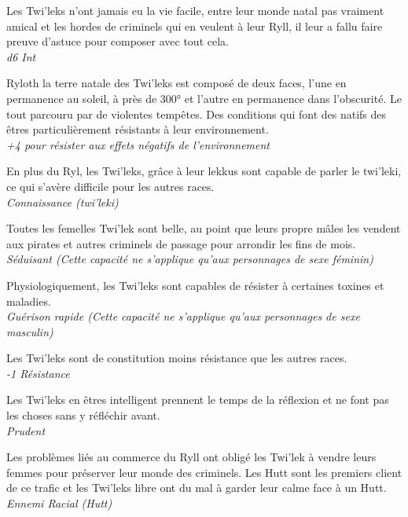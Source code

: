 \begin{description}[align=left]
\item [Rusé \& Astucieux] 			%
		Les Twi’leks n’ont jamais eu la vie facile, entre leur monde natal pas vraiment amical et les hordes de criminels qui en veulent à leur Ryll, il leur a fallu faire preuve d’astuce pour composer avec tout cela.\\
		\emph{d6 Int}

\item [Ni chaud ni froid] 			%
		Ryloth la terre natale des Twi’leks est composé de deux faces, l’une en permanence au soleil, à près de 300° et l’autre en permanence dans l’obscurité. Le tout parcouru par de violentes tempêtes. Des conditions qui font des natifs des êtres particulièrement résistants à leur environnement.\\
		\emph{+4 pour résister aux effets négatifs de l’environnement}

\item [Lekkus Speaking] 			%
		En plus du Ryl, les Twi’leks, grâce à leur lekkus sont capable de parler le twi’leki, ce qui s’avère difficile pour les autres races.\\
		\emph{Connaissance (twi’leki)}

\item [Belle plante (Femelles)] 	%
		Toutes les femelles Twi’lek sont belle, au point que leurs propre mâles les vendent aux pirates et autres criminels de passage pour arrondir les fins de mois.\\
		\emph{Séduisant (Cette capacité ne s’applique qu’aux personnages de sexe féminin)}

\item [Immunisé (Mâles)] 			%
		Physiologiquement, les Twi’leks sont capables de résister à certaines toxines et maladies.\\
		\emph{Guérison rapide (Cette capacité ne s’applique qu’aux personnages de sexe masculin)}

\item [Frêles] 						%
		Les Twi’leks sont de constitution moins résistance que les autres races.\\
		\emph{-1 Résistance}

\item [Prudent] 					%
		Les Twi’leks en êtres intelligent prennent le temps de la réflexion et ne font pas les choses sans y réfléchir avant.\\
		\emph{Prudent}

\item [Hutt(er)] 					%
		Les problèmes liés au commerce du Ryll ont obligé les Twi’lek à vendre leurs femmes pour préserver leur monde des criminels. Les Hutt sont les premiers client de ce trafic et les Twi’leks libre ont du mal à garder leur calme face à un Hutt.\\
		\emph{Ennemi Racial (Hutt)}
\end{description}